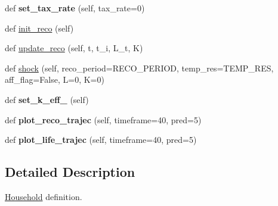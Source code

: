 \begin{DoxyCompactItemize}
def {\bfseries set\+\_\+tax\+\_\+rate} (self, tax\+\_\+rate=0)
\item 
def \hyperlink{classhousehold_1_1Household_af60008bacefd13fc398091bc7fc06f05}{init\+\_\+reco} (self)
\item 
def \hyperlink{classhousehold_1_1Household_a96a14035a0b3c03c6cf951251d5f941e}{update\+\_\+reco} (self, t, t\+\_\+i, L\+\_\+t, K)
\item 
def \hyperlink{classhousehold_1_1Household_ab9aa47f8e64ddaf4825c90c1832b3ddd}{shock} (self, reco\+\_\+period=R\+E\+C\+O\+\_\+\+P\+E\+R\+I\+OD, temp\+\_\+res=T\+E\+M\+P\+\_\+\+R\+ES, aff\+\_\+flag=False, L=0, K=0)
\item 
\mbox{\label{classhousehold_1_1Household_ad17bac4d94f85674706a38d75f49cf5f}} 
def {\bfseries set\+\_\+k\+\_\+eff\+\_} (self)
\item 
\mbox{\label{classhousehold_1_1Household_ae27f3f5fc9f5aedd97ebd5893b9fe08d}} 
def {\bfseries plot\+\_\+reco\+\_\+trajec} (self, timeframe=40, pred=5)
\item 
\mbox{\label{classhousehold_1_1Household_acfc35999faf730815e06efcb2ad28bfe}} 
def {\bfseries plot\+\_\+life\+\_\+trajec} (self, timeframe=40, pred=5)
\end{DoxyCompactItemize}


\subsection{Detailed Description}
\hyperlink{classhousehold_1_1Household}{Household} definition. 

